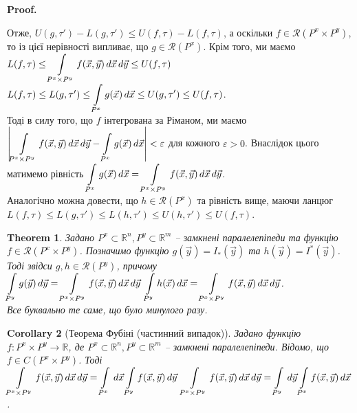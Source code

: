 \documentclass[a4paper, 10pt]{article}
\makeatletter
\def\qed{$\blacksquare$}
\theoremstyle{theoremdd}
\newtheorem{theorem}{Theorem}[subsection]
\theoremstyle{theoremdd}
\theoremstyle{theoremdd}
\theoremstyle{theoremdd}
\theoremstyle{theoremdd}
\theoremstyle{theoremdd}
\theoremstyle{theoremdd}
\theoremstyle{theoremdd}
\theoremstyle{theoremdd}
\theoremstyle{theoremdd}
\theoremstyle{theoremdd}
\theoremstyle{theoremdd}
\theoremstyle{theoremdd}
\theoremstyle{theoremdd}
\newtheorem{corollary}[theorem]{Corollary}
\theoremstyle{theoremdd}
\renewenvironment{proof}[1][Proof.\\]{\par
\pushQED{\hfill \qed}%
\normalfont \topsep6\p@\@plus6\p@\relax
\trivlist
\item\relax
{\bfseries
#1\@addpunct{.}}\hspace\labelsep\ignorespaces
}{%
\popQED\endtrivlist\@endpefalse
}
\makeatother
\begin{document}
\begin{proof}
Отже, $U(g,\tau') - L(g,\tau') \leq U(f,\tau) - L(f,\tau)$, а оскільки $f \in \mathcal{R}(P^x \times P^y)$, то із цієї нерівності випливає, що $g \in \mathcal{R}(P^x)$. Крім того, ми маємо\\
$L(f,\tau) \leq \displaystyle\int\displaylimits_{P^x \times P^y} f(\vec{x},\vec{y})\,d\vec{x}\,d\vec{y} \leq U(f,\tau)$ \qquad $L(f,\tau) \leq L(g,\tau') \leq \displaystyle\int\displaylimits_{P^x}g(\vec{x})\,d\vec{x} \leq U(g,\tau') \leq U(f,\tau)$.\\
Тоді в силу того, що $f$ інтегрована за Ріманом, ми маємо $\displaystyle\left| \int\displaylimits_{P^x \times P^y} f(\vec{x},\vec{y})\,d\vec{x}\,d\vec{y} - \int\displaylimits_{P^x} g(\vec{x})\,d\vec{x} \right| < \varepsilon$ для кожного $\varepsilon > 0$. Внаслідок цього матимемо рівність $\displaystyle\int\displaylimits_{P^x} g(\vec{x})\,d\vec{x} = \int\displaylimits_{P^x \times P^y} f(\vec{x},\vec{y})\,d\vec{x}\,d\vec{y}$.\\
Аналогічно можна довести, що $h \in \mathcal{R}(P^x)$ та рівність вище, маючи ланцюг\\
$L(f,\tau) \leq L(g,\tau') \leq L(h,\tau') \leq U(h,\tau') \leq U(f,\tau)$.
\end{proof}

\begin{theorem}
Задано $P^x \subset \mathbb{R}^n, P^y \subset \mathbb{R}^m$ -- замкнені паралелепіпеди та функцію $f \in \mathcal{R}(P^x \times P^y)$. Позначимо функцію $g(\vec{y}) = I_*(\vec{y})$ та $h(\vec{y}) = I^*(\vec{y})$. Тоді звідси $g,h \in \mathcal{R}(P^y)$, причому\\
$\displaystyle\int\displaylimits_{P^y} g(\vec{y})\,d\vec{y} = \int\displaylimits_{P^x \times P^y} f(\vec{x},\vec{y})\,d\vec{x}\,d\vec{y}$ \qquad $\displaystyle\int\displaylimits_{P^y} h(\vec{x})\,d\vec{x} = \int\displaylimits_{P^x \times P^y} f(\vec{x},\vec{y})\,d\vec{x}\,d\vec{y}$.\\
\textit{Все буквально те саме, що було минулого разу.}
\end{theorem}

\begin{corollary}[Теорема Фубіні (частинний випадок)]
Задано функцію $f \colon P^x \times P^y \to \mathbb{R}$, де $P^x \subset \mathbb{R}^n, P^y \subset \mathbb{R}^m$ -- замкнені паралелепіпеди. Відомо, що $f \in C(P^x \times P^y)$. Тоді\\
$\displaystyle\int\displaylimits_{P^x \times P^y} f(\vec{x},\vec{y})\,d\vec{x}\,d\vec{y} = \int\displaylimits_{P^x}\,d\vec{x} \int\displaylimits_{P^y}f(\vec{x},\vec{y})\,d\vec{y}$ \qquad $\displaystyle\int\displaylimits_{P^x \times P^y} f(\vec{x},\vec{y})\,d\vec{x}\,d\vec{y} = \int\displaylimits_{P^y}\,d\vec{y} \int\displaylimits_{P^x}f(\vec{x},\vec{y})\,d\vec{x}$.
\end{corollary}
\end{document}
